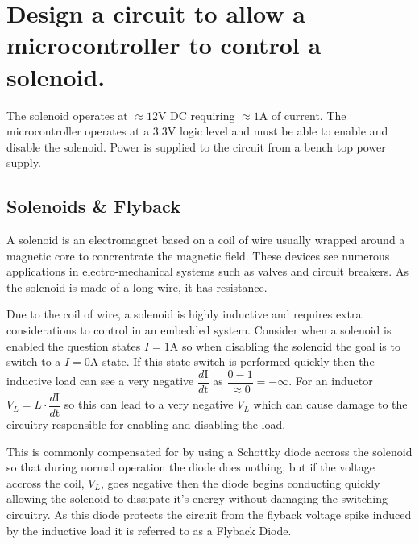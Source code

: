 \documentclass[main.tex]{subfiles}
\begin{document}
\section{Design a circuit to allow a microcontroller to control a solenoid.} \label{section:switching}

The solenoid operates at $\approx 12\text{V}$ DC requiring $\approx 1\text{A}$ of current. The microcontroller operates at a $3.3\text{V}$ logic level and must be able to enable and disable the solenoid. Power is supplied to the circuit from a bench top power supply. 

\spoilerline

\subsection{Solenoids \& Flyback}
A solenoid is an electromagnet based on a coil of wire usually wrapped around a magnetic core to concrentrate the magnetic field. These devices see numerous applications in electro-mechanical systems such as valves and circuit breakers. As the solenoid is made of a long wire, it has resistance. \newline

\newnoindentpara Due to the coil of wire, a solenoid is highly inductive and requires extra considerations to control in an embedded system. Consider when a solenoid is enabled the question states $I = 1\text{A}$ so when disabling the solenoid the goal is to switch to a $I = 0 \text{A}$ state. If this state switch is performed quickly then the inductive load can see a very negative $\dfrac{d\text{I}}{d\text{t}}$ as $\dfrac{0 - 1}{\approx 0} = - \infty$. For an inductor $V_L = L \cdot \dfrac{d\text{I}}{d\text{t}}$ so this can lead to a very negative $V_L$ which can cause damage to the circuitry responsible for enabling and disabling the load. \newline

\newnoindentpara This is commonly compensated for by using a Schottky diode accross the solenoid so that during normal operation the diode does nothing, but if the voltage accross the coil, $V_L$, goes negative then the diode begins conducting quickly allowing the solenoid to dissipate it's energy without damaging the switching circuitry. As this diode protects the circuit from the flyback voltage spike induced by the inductive load it is referred to as a Flyback Diode. 
\end{document}

